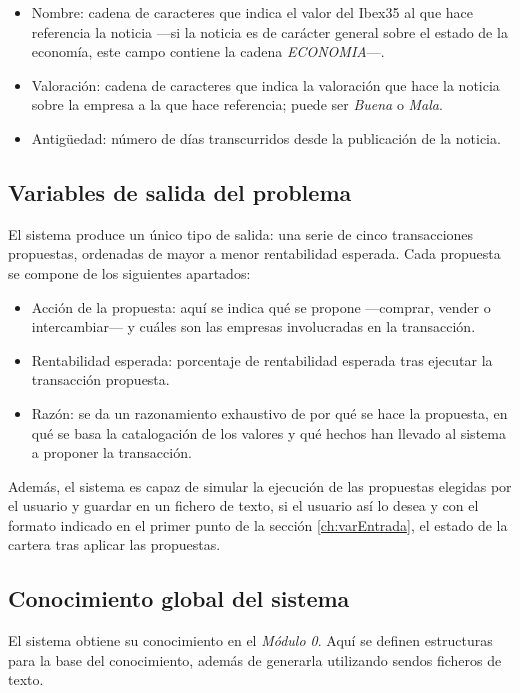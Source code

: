 \documentclass[a4paper, 11pt, titlepage]{article}
\theoremstyle{definition}
\begin{document}
\begin{enumerate}
        \begin{itemize}
            \item Nombre: cadena de caracteres que indica el valor del Ibex35 al que hace referencia la noticia ---si la noticia es de carácter general sobre el estado de la economía, este campo contiene la cadena \emph{ECONOMIA}---.
            \item Valoración: cadena de caracteres que indica la valoración que hace la noticia sobre la empresa a la que hace referencia; puede ser \emph{Buena} o \emph{Mala}.
            \item Antigüedad: número de días transcurridos desde la publicación de la noticia.
        \end{itemize}
    \end{enumerate}

  \subsection{Variables de salida del problema}

  El sistema produce un único tipo de salida: una serie de cinco transacciones propuestas, ordenadas de mayor a menor rentabilidad esperada. Cada propuesta se compone de los siguientes apartados:
  \begin{itemize}
      \item Acción de la propuesta: aquí se indica qué se propone ---comprar, vender o intercambiar--- y cuáles son las empresas involucradas en la transacción.
      \item Rentabilidad esperada: porcentaje de rentabilidad esperada tras ejecutar la transacción propuesta.
      \item Razón: se da un razonamiento exhaustivo de por qué se hace la propuesta, en qué se basa la catalogación de los valores y qué hechos han llevado al sistema a proponer la transacción.
  \end{itemize}

  Además, el sistema es capaz de simular la ejecución de las propuestas elegidas por el usuario y guardar en un fichero de texto, si el usuario así lo desea y con el formato indicado en el primer punto de la sección \ref{ch:varEntrada}, el estado de la cartera tras aplicar las propuestas.

  \subsection{Conocimiento global del sistema}
  El sistema obtiene su conocimiento en el \emph{Módulo 0}. Aquí se definen
  estructuras para la base del conocimiento, además de generarla utilizando
  sendos ficheros de texto.
\end{document}
